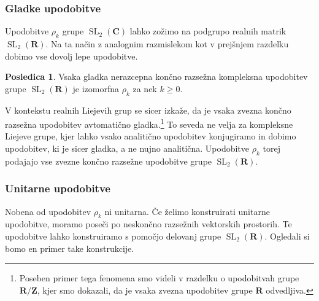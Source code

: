 \documentclass[11pt]{book}
\def\ZZ{\mathbf{Z}}
\def\RR{\mathbf{R}}
\def\CC{\mathbf{C}}
\DeclareMathOperator\SL{SL}
\theoremstyle{definition}
\theoremstyle{zgled}
\theoremstyle{zgledbrezstevilke}
\theoremstyle{odprtproblem}
\theoremstyle{domacanaloga}
\theoremstyle{izrek}
\newtheorem{posledica}[theorem]{Posledica}
\begin{document}
\subsubsection{Gladke upodobitve}

Upodobitve $\rho_k$ grupe $\SL_2(\CC)$ lahko zožimo na podgrupo realnih matrik $\SL_2(\RR)$. Na ta način z analognim razmislekom kot v prejšnjem razdelku dobimo vse dovolj lepe upodobitve. 

\begin{posledica}
Vsaka gladka nerazcepna končno razsežna kompleksna upodobitev grupe $\SL_2(\RR)$ je izomorfna $\rho_k$ za nek $k \geq 0$.
\end{posledica}

V kontekstu realnih Liejevih grup se sicer izkaže, da je vsaka zvezna končno razsežna upodobitev avtomatično gladka.\footnote{Poseben primer tega fenomena smo videli v razdelku o upodobitvah grupe $\RR/\ZZ$, kjer smo dokazali, da je vsaka zvezna upodobitev grupe $\RR$ odvedljiva.} To seveda ne velja za kompleksne Liejeve grupe, kjer lahko vsako analitično upodobitev konjugiramo in dobimo upodobitev, ki je sicer gladka, a ne nujno analitična. Upodobitve $\rho_k$ torej podajajo vse zvezne končno razsežne upodobitve grupe $\SL_2(\RR)$. 

\subsubsection{Unitarne upodobitve}

Nobena od upodobitev $\rho_k$ ni unitarna. Če želimo konstruirati unitarne upodobitve, moramo poseči po neskončno razsežnih vektorskih prostorih. Te upodobitve lahko konstruiramo s pomočjo delovanj grupe $\SL_2(\RR)$. Ogledali si bomo en primer take konstrukcije.
\end{document}
